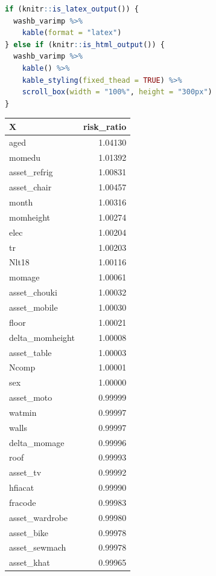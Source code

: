 \documentclass[12pt, krantz2,]{krantz}
\theoremstyle{definition}
\theoremstyle{definition}
\theoremstyle{definition}
\newcommand{\1}{\mathbbm{1}}
\begin{document}
\begin{lstlisting}[language=R]
if (knitr::is_latex_output()) {
  washb_varimp %>%
    kable(format = "latex")
} else if (knitr::is_html_output()) {
  washb_varimp %>%
    kable() %>%
    kable_styling(fixed_thead = TRUE) %>%
    scroll_box(width = "100%", height = "300px")
}
\end{lstlisting}

\begin{tabular}{l|r}
\hline
X & risk\_ratio\\
\hline
aged & 1.04130\\
\hline
momedu & 1.01392\\
\hline
asset\_refrig & 1.00831\\
\hline
asset\_chair & 1.00457\\
\hline
month & 1.00316\\
\hline
momheight & 1.00274\\
\hline
elec & 1.00204\\
\hline
tr & 1.00203\\
\hline
Nlt18 & 1.00116\\
\hline
momage & 1.00061\\
\hline
asset\_chouki & 1.00032\\
\hline
asset\_mobile & 1.00030\\
\hline
floor & 1.00021\\
\hline
delta\_momheight & 1.00008\\
\hline
asset\_table & 1.00003\\
\hline
Ncomp & 1.00001\\
\hline
sex & 1.00000\\
\hline
asset\_moto & 0.99999\\
\hline
watmin & 0.99997\\
\hline
walls & 0.99997\\
\hline
delta\_momage & 0.99996\\
\hline
roof & 0.99993\\
\hline
asset\_tv & 0.99992\\
\hline
hfiacat & 0.99990\\
\hline
fracode & 0.99983\\
\hline
asset\_wardrobe & 0.99980\\
\hline
asset\_bike & 0.99978\\
\hline
asset\_sewmach & 0.99978\\
\hline
asset\_khat & 0.99965\\
\hline
\end{tabular}
\end{document}
